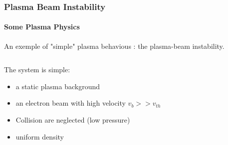 \documentclass[sans, aspectratio=169]{beamer}
\begin{document}
\begin{frame}
	\frametitle{Plasma Beam Instability} 
	\framesubtitle{Some Plasma Physics} 

	An exemple of "simple" plasma behavious : the plasma-beam instability.

\begin{columns}

\begin{column}{0.55\linewidth}
The system is simple:
	\begin{itemize}
		\item a static plasma background
		\item an electron beam with high velocity $v_b >> v_{th}$
		\item Collision are neglected (low pressure)
		\item uniform density
		
	\end{itemize}
\end{column}

\begin{column}{0.35\linewidth}
\end{column}

\end{columns}	

\end{frame}
\end{document}
